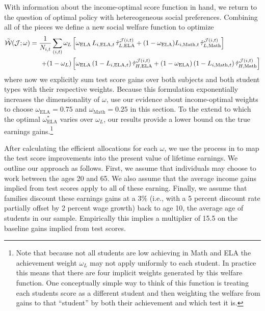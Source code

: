 \documentclass[12pt]{article}
\theoremstyle{definition}
\theoremstyle{definition}
\theoremstyle{definition}
\theoremstyle{definition}
\begin{document}
With information about the income-optimal score function in hand, we return to the question of 
optimal policy with hetereogeneous social preferences. Combining all of the pieces we define a new social welfare function to optimize
\begin{align*}
\accentset{\sim}{\mathcal{W}}(\mathcal{J};\omega) =  \frac{1}{N_{i,t}}\sum_{(i,t)} \omega_L &\left [\omega_{\text{ELA}} \, L_{i,\text{ELA},t} \,\hat{\tau}^{\mathcal{J}(i,t)}_{L,\text{ELA}}  + (1-\omega_{\text{ELA}}) L_{i,\text{Math},t} \,\hat{\tau}^{\mathcal{J}(i,t)}_{L,\text{Math}} \right ] \\
+(1-\omega_L) & \left [\omega_{\text{ELA}} \, (1-L_{i,\text{ELA},t}) \,\hat{\tau}^{\mathcal{J}(i,t)}_{H,\text{ELA}}  + (1-\omega_{\text{ELA}}) \, (1-L_{i,\text{Math},t}) \,\hat{\tau}^{\mathcal{J}(i,t)}_{H,\text{Math}} \right ]
\end{align*}
\noindent where now we explicitly sum test score gains over both subjects and both student types with their respective weights. Because this formulation exponentially increases the dimensionality of $\omega$, use our evidence about income-optimal weights to choose $\omega_{\text{ELA}}=0.75$  and $\omega_{\text{Math}}=0.25$ in this section. To the extend to which the optimal $\omega^*_{\text{ELA}}$ varies over $\omega_L$, our results provide a lower bound on the true earnings gains.\footnote{Note that because not all students are low achieving in Math and ELA the achievement weight $\omega_L$ may not apply uniformly to each student. In practice this means that there are four implicit weights generated by this welfare function. One conceptually simple way to think of this function is treating each students score as a different student and then weighting the welfare from gains to that ``student'' by both their achievement and which test it is.}

After calculating the efficient allocations for each $\omega$, we use the process in \citet{chetty2014measuring1} to map the test score improvements into the present value of lifetime earnings. We outline our approach as follows. First, we assume that individuals may choose to work between the ages 20 and 65. We also assume that the average income gains implied from test scores apply to all of these earning. Finally, we assume that families discount these earnings gains at a 3\% (i.e., with a 5 percent discount rate partially offset by 2 percent wage growth) back to age 10, the average age of students in our sample. Empirically this implies a multiplier of 15.5 on the baseline gains implied from test scores.
\end{document}
